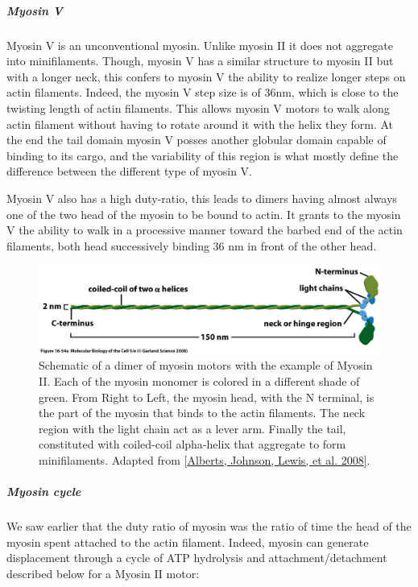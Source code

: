 \documentclass[A4paperpaper,11pt,english]{sphinxmanual}
\begin{document}
\subparagraph{Myosin V}
\label{index-latex:myosin-v}
Myosin V is an unconventional myosin. Unlike myosin II it does not aggregate
into minifilaments.  Though, myosin V has a similar structure to myosin II but
with a longer neck, this confers to myosin V the ability to realize longer
steps on actin filaments. Indeed, the myosin V step size is of 36nm, which is close to the
twisting length of actin filaments. This allows myosin V motors to walk along
actin filament without having to rotate around it with the helix they form. At the end the tail domain
myosin V posses another globular domain capable of binding to its cargo, and
the variability of this region is what mostly define the difference between the
different type of myosin V.

Myosin V also has a high duty-ratio, this leads to dimers having almost always
one of the two head of the myosin to be bound to actin. It grants to the myosin
V the ability to walk in a processive manner toward the barbed end of
the actin filaments, both head successively binding 36 nm in front of the other
head.
\begin{figure}[htbp]
\centering
\capstart

\includegraphics[width=0.700\linewidth]{figure-16-54a.jpg}
\caption{Schematic of a dimer of myosin motors with the example of Myosin II.
Each of the myosin monomer is colored in a
different shade of green. From Right to Left, the myosin head, with the N
terminal, is the part of the myosin that binds to the actin filaments. The
neck region with the light chain act as a lever arm. Finally the tail,
constituted with coiled-coil alpha-helix that aggregate to form minifilaments.
Adapted from {\hyperref[index-latex:alberts2008]{{[}Alberts, Johnson, Lewis,  et al.  2008{]}}}.}\label{index-latex:fig-myosin}\end{figure}


\subparagraph{Myosin cycle}
\label{index-latex:myosin-cycle}
We saw earlier that the duty ratio of myosin was the ratio of time the head of
the myosin spent attached to the actin filament. Indeed, myosin can generate
displacement through a cycle of ATP hydrolysis and attachment/detachment
described below for a Myosin II motor:
\end{document}
